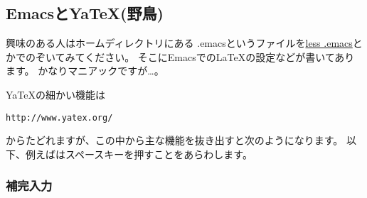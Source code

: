 \subsection{EmacsとYaTeX(野鳥)}
興味のある人はホームディレクトリにある
.emacsというファイルを\underline{less .emacs}とかでのぞいてみてください。
そこにEmacsでの{\LaTeX}の設定などが書いてあります。
かなりマニアックですが…。

YaTeXの細かい機能は
\begin{screen}
\begin{verbatim}
http://www.yatex.org/
\end{verbatim}
\end{screen}
からたどれますが、この中から主な機能を抜き出すと次のようになります。
以下、例えばはスペースキーを押すことをあらわします。

\subsubsection{補完入力}
